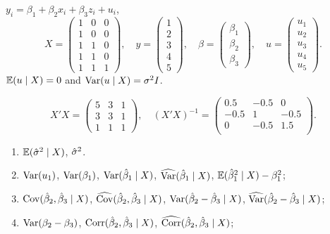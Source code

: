 \begin{problem}
  $y_i = \beta_1 + \beta_2 x_{i} + \beta_3 z_i + u_i$, 
\[
X = \begin{pmatrix} 
  1 & 0 & 0 \\ 
  1 & 0 & 0 \\ 
  1 & 1 & 0 \\ 
  1 & 1 & 0 \\ 
  1 & 1 & 1 
\end{pmatrix}, \quad
y = \begin{pmatrix} 1 \\ 2 \\ 3 \\ 4 \\ 5 \end{pmatrix}, \quad
\beta = \begin{pmatrix} \beta_1 \\ \beta_2 \\ \beta_3 \end{pmatrix}, \quad
u = \begin{pmatrix} u_1 \\ u_2 \\ u_3 \\ u_4 \\ u_5  \end{pmatrix}.
\]
$\operatorname{\mathbb{E}}(u \mid X) = 0$ and $\operatorname{Var}(u \mid X) = \sigma^2 I$. 

\[
X'X = \begin{pmatrix} 
  5 & 3 & 1 \\ 
  3 & 3 & 1\\ 
  1 & 1 & 1 
\end{pmatrix}, \quad
(X' X)^{-1} =  \begin{pmatrix}
  0.5 & -0.5 & 0 \\
  -0.5 & 1 & -0.5 \\
  0 & -0.5 & 1.5 \\
  \end{pmatrix}.
\]


\begin{enumerate}
\item {} $\operatorname{\mathbb{E}} (\hat{\sigma}^2 \mid X)$, $\hat{\sigma}^2$.
\item {}  $\operatorname{Var} (u_1)$, $\operatorname{Var} (\beta_1)$, $\operatorname{Var} (\hat{\beta}_1 \mid X)$, $\operatorname{\widehat{\operatorname{Var}}}(\hat{\beta}_1 \mid X)$, $\operatorname{\mathbb{E}} (\hat{\beta}_1^2 \mid X) - \beta_1^2$;
\item {}  $\operatorname{Cov} (\hat{\beta}_2, \hat{\beta}_3 \mid X)$, $\operatorname{\widehat{\operatorname{Cov}}}(\hat{\beta}_2, \hat{\beta}_3 \mid X)$, $\operatorname{Var} (\hat{\beta}_2 - \hat{\beta}_3 \mid X)$, $\operatorname{\widehat{\operatorname{Var}}}(\hat{\beta}_2 - \hat{\beta}_3 \mid X)$;
\item {}  $\operatorname{Var} (\beta_2 - \beta_3)$, $\operatorname{Corr} (\hat{\beta}_2, \hat{\beta}_3 \mid X)$, $\operatorname{\widehat{\operatorname{Corr}}}(\hat{\beta}_2, \hat{\beta}_3 \mid X)$;
\end{enumerate}


\end{problem}
